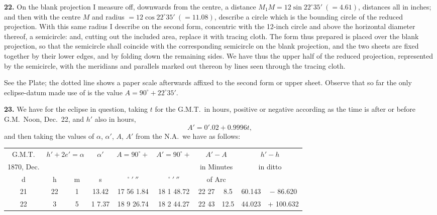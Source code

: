 \documentclass[11pt,a4paper]{article}
\begin{document}
\noindent\textbf{22.} On the blank projection I measure off, downwards from the centre, a distance $M_{1}M = 12 \sin 22^{\circ}35'\ (= 4.61)$, distances all in inches; and then with the centre $M$ and radius $= 12 \cos 22^{\circ}35'\ (= 11.08)$, describe a circle which is the bounding circle of the reduced projection. With this same radius I describe on the second form, concentric with the 12-inch circle and above the horizontal diameter thereof, a semicircle: and, cutting out the included area, replace it with tracing cloth. The form thus prepared is placed over the blank projection, so that the semicircle shall coincide with the corresponding semicircle on the blank projection, and the two sheets are fixed together by their lower edges, and by folding down the remaining sides. We have thus the upper half of the reduced projection, represented by the semicircle, with the meridians and parallels marked out thereon by lines seen through the tracing cloth.

See the Plate; the dotted line shows a paper scale afterwards affixed to the second form or upper sheet. Observe that so far the only eclipse-datum made use of is the value $A = 90^{\circ} + 22^{\circ}35'$.

\noindent\textbf{23.} We have for the eclipse in question, taking $t$ for the G.M.T.\ in hours, positive or negative according as the time is after or before G.M.\ Noon, Dec.\ 22, and $h'$ also in hours,
\[
A' = 0'.02 + 0.9996t,
\]
and then taking the values of $\alpha$, $\alpha'$, $A$, $A'$ from the N.A.\ we have as follows:

\begin{center}
\begin{tabular}{|c|c|c|c|c|c|c|c|c|c|}
\hline
G.M.T. & \multicolumn{2}{c|}{$h'+2e'=\alpha$} & $\alpha'$ & $A=90^{\circ}+$ & $A'=90^{\circ}+$ & \multicolumn{2}{c|}{$A'-A$} & \multicolumn{2}{c|}{$h'-h$} \\\cline{2-3}\cline{7-10}
1870, Dec. & & & & & & \multicolumn{2}{c|}{in Minutes} & \multicolumn{2}{c|}{in ditto} \\\cline{2-3}\cline{7-10}
d & h & m & s & $^{\circ}\ '\ ''$ & $^{\circ}\ '\ ''$ & \multicolumn{2}{c|}{of Arc} & \multicolumn{2}{c|}{} \\\hline
21 & 22 & 1 & 13.42 & 17 56 1.84 & 18 1 48.72 & 22 27 & 8.5 & 60.143 & $-$ 86.620 \\\hline
22 & 3 & 5 & 1 7.37 & 18 9 26.74 & 18 2 44.27 & 22 43 & 12.5 & 44.023 & + 100.632 \\\hline
\end{tabular}
\end{center}
\end{document}
